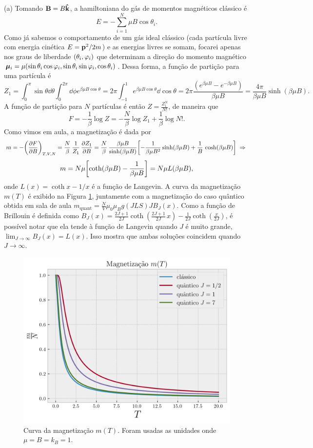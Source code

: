 \documentclass[a4paper,10pt]{article}
\begin{document}
(a) Tomando $\vb{B} = B \vu{k}$, a hamiltoniana do gás de momentos magnéticos clássico é
$$
E = - \sum_{i = 1}^{N} \mu B \cos\theta_i.
$$
Como já sabemos o comportamento de um gás ideal clássico (cada partícula livre com energia cinética $E = \vb{p}^2/2m$) e as energias livres se somam, focarei apenas nos graus de liberdade $(\theta_i, \varphi_i)$ que determinam a direção do momento magnético $\bm{\mu}_i = \mu (\sin\theta_i\cos\varphi_i, \sin\theta_i\sin\varphi_i, \cos\theta_i)$. Dessa forma, a função de partição para uma partícula é
$$
Z_1 = \int_0^\pi \sin\theta \dd{\theta} \int_0^{2\pi} \dd{\phi} e^{\beta\mu B\cos\theta} =
2\pi \int_{-1}^{1} e^{\beta\mu B\cos\theta} \dd{\cos\theta} =
2\pi \frac{(e^{\beta\mu B} - e^{-\beta\mu B})}{\beta\mu B} = \frac{4\pi}{\beta\mu B} \sinh(\beta\mu B).
$$
A função de partição para $N$ partículas é então $Z = \frac{Z_1^N}{N!}$, de maneira que
$$
F = -\frac{1}{\beta} \log Z = - \frac{N}{\beta} \log Z_1 + \frac{1}{\beta} \log N!.
$$
Como vimos em aula, a magnetização é dada por
$$
m = -\qty(\pdv{F}{B})_{T,V,N} = \frac{N}{\beta} \, \frac{1}{Z_1} \, \pdv{Z_1}{B} = \frac{N}{\beta} \,
\frac{\beta \mu B}{\sinh(\beta \mu B)} \qty[-\frac{1}{\beta\mu B^2} \sinh(\beta\mu B) + \frac{1}{B} \, \cosh(\beta\mu B)]
\; \Rightarrow \;
$$
$$
m = N\mu \qty[\coth(\beta\mu B)-\frac{1}{\beta\mu B}] = N \mu L(\beta\mu B),
$$
onde $L(x) = \coth x - 1/x$ é a função de Langevin. A curva da magnetização $m(T)$ é exibido na Figura \ref{fig:magnetiz}, juntamente com a magnetização do caso quântico obtida em sala de aula $m_{\text{quant}} = \frac{N}{V} \mu_0 \mu_B g(JLS) J B_J(x)$. Como a função de Brillouin é definida como $B_J(x) = \frac{2J+1}{2J} \coth(\frac{2J+1}{2J} \, x) - \frac{1}{2J} \coth(\frac{x}{2J})$, é possível notar que ela tende à função de Langevin quando $J$ é muito grande, $\lim_{J \to \infty} B_J(x) = L(x)$. Isso mostra que ambas soluções coincidem quando $J \to \infty$.
\begin{figure}[H]
\centering
\includegraphics[width=0.7\linewidth]{fig/magnetiz.png}
\caption{Curva da magnetização $m(T)$. Foram usadas as unidades onde $\mu = B = k_B = 1$.}
\label{fig:magnetiz}
\end{figure}
\end{document}
